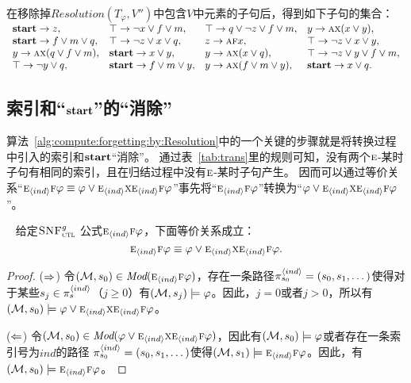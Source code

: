 \begin{example}\label{examp:remA}
	在移除掉$Resolution(T_{\varphi}, V'')$中包含$V$中元素的子句后，得到如下子句的集合：\\
	$
	\begin{array}{llll}
		\textbf{start}\rightarrow z, & 
		\top \rightarrow \neg x\vee f \vee m, &
		\top \rightarrow q \vee \neg z \vee f \vee m, &
		y \rightarrow \textsc{a} \textsc{x}(x\vee y), \\ 
		\textbf{start} \rightarrow f\vee m \vee q,  & 
		\top \rightarrow \neg z \vee x \vee q, &
		z \rightarrow \textsc{a} \textsc{f} x, &  
		\top \rightarrow \neg z \vee x \vee y, \\
		y \rightarrow \textsc{a}\textsc{x}(q \vee f\vee m), &
		\textbf{start} \rightarrow x \vee y, &
		y \rightarrow \textsc{a}\textsc{x}(x\vee q), &
		\top \rightarrow \neg z \vee y \vee f \vee m,\\
		\top \rightarrow \neg y \vee q,  & 
		\textbf{start} \rightarrow f\vee m \vee y, &
		y \rightarrow \textsc{a}\textsc{x}(f\vee m\vee y), &
		\textbf{start} \rightarrow x \vee q.
	\end{array}
	$
\end{example}

\subsection{索引和“$\textbf{start}$”的“消除”}
算法~\ref{alg:compute:forgetting:by:Resolution}中的一个关键的步骤就是将转换过程中引入的索引和$\textbf{start}$“消除”。
通过表~\ref{tab:trans}里的规则可知，没有两个$\textsc{e}$-某时子句有相同的索引，且在归结过程中没有$\textsc{e}$-某时子句产生。
因而可以通过等价关系“$\textsc{e}_{{\langle{ind}\rangle}} \textsc{f} \varphi \equiv \varphi \vee \textsc{e}_{{\langle{ind}\rangle}} \textsc{x} \textsc{e}_{{\langle{ind}\rangle}}\textsc{f} \varphi$”事先将“$\textsc{e}_{{\langle{ind}\rangle}} \textsc{f} \varphi$”转换为“$\varphi \vee \textsc{e}_{{\langle{ind}\rangle}} \textsc{x} \textsc{e}_{{\langle{ind}\rangle}}\textsc{f} \varphi$”。


\begin{lemma}~\label{lem:Ind:EF}
	给定${\textsc{SNF}_{\textsc{ctl}}^g}$ 公式$\textsc{e}_{{\langle{ind}\rangle}} \textsc{f} \varphi$，下面等价关系成立：
	\[
	\textsc{e}_{{\langle{ind}\rangle}} \textsc{f} \varphi \equiv \varphi \vee \textsc{e}_{{\langle{ind}\rangle}} \textsc{x} \textsc{e}_{{\langle{ind}\rangle}}\textsc{f} \varphi.
	\]
\end{lemma}

\begin{proof}
	($\Rightarrow$) 令$({\cal M}, s_0) \in \textit{Mod}(\textsc{e}_{{\langle{ind}\rangle}} \textsc{f} \varphi)$，存在一条路径$\pi_{s_0}^{{\langle{ind}\rangle}} = (s_0, s_1, \dots)$使得对于某些$s_j \in \pi_s^{{\langle{ind}\rangle}}$（$j \ge 0$）有$({\cal M}, s_j) \models \varphi$。因此，$j=0$或者$j > 0$，所以有$({\cal M}, s_0) \models  \varphi \vee \textsc{e}_{{\langle{ind}\rangle}} \textsc{x} \textsc{e}_{{\langle{ind}\rangle}}\textsc{f} \varphi$。
	
	($\Leftarrow$) 令$({\cal M}, s_0) \in \textit{Mod}(\varphi \vee \textsc{e}_{{\langle{ind}\rangle}} \textsc{x} \textsc{e}_{{\langle{ind}\rangle}}\textsc{f} \varphi)$，因此有$({\cal M},s_0) \models \varphi$或者存在一条索引号为$ind$的路径 $\pi_{s_0}^{{\langle{ind}\rangle}} = (s_0, s_1, \dots)$使得$({\cal M}, s_1) \models \textsc{e}_{{\langle{ind}\rangle}}\textsc{f} \varphi$。因此，有$({\cal M}, s_0) \models \textsc{e}_{{\langle{ind}\rangle}} \textsc{f} \varphi$。
\end{proof}


